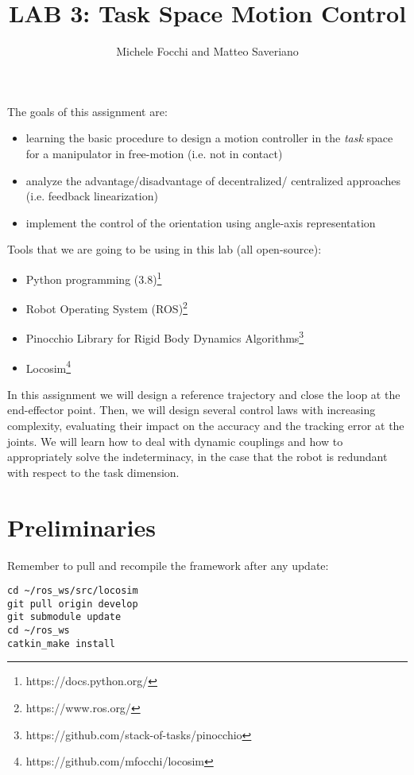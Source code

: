 \documentclass[11pt]{article}
\title{LAB 3: Task Space Motion Control}
\author{Michele Focchi and Matteo Saveriano}
\date{}
\begin{document}
	\maketitle
	\noindent
	The goals of this assignment are:
	\begin{itemize}
		\item learning the basic procedure to design a motion controller in the \textit{task} space for a manipulator in free-motion (i.e. not in contact)
		\item analyze the advantage/disadvantage of decentralized/ centralized approaches (i.e. feedback linearization)
		\item implement the control of the orientation using angle-axis representation
	\end{itemize}
	
	\noindent
	Tools that we are going to be using in this lab (all open-source):
	\begin{itemize}
		\item Python programming (3.8)\footnote{https://docs.python.org/}
		\item Robot Operating System (ROS)\footnote{https://www.ros.org/}
		\item Pinocchio Library for Rigid Body Dynamics Algorithms\footnote{https://github.com/stack-of-tasks/pinocchio}
		\item Locosim\footnote{https://github.com/mfocchi/locosim}
	\end{itemize}
	In this assignment we will design a reference trajectory and close the loop at the end-effector point. 
	Then, we will design several control laws with increasing complexity, 
	evaluating their impact on the accuracy and the tracking error at the joints.
	We will learn how to deal with dynamic 
	couplings and how to appropriately solve the indeterminacy, in the case that the  
	robot is redundant with respect to the task dimension. 
	
\section{Preliminaries}
Remember to pull and recompile the framework after any update:

\begin{verbatim}
cd ~/ros_ws/src/locosim
git pull origin develop 
git submodule update
cd ~/ros_ws
catkin_make install
\end{verbatim}
\end{document}
